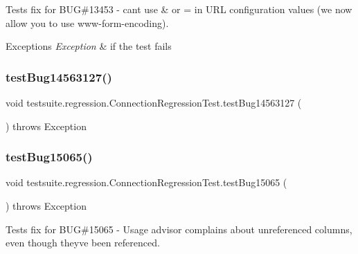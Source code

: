 Tests fix for B\+UG\#13453 -\/ can\textquotesingle{}t use \& or = in U\+RL configuration values (we now allow you to use www-\/form-\/encoding).


\begin{DoxyExceptions}{Exceptions}
{\em Exception} & if the test fails \\
\hline
\end{DoxyExceptions}
\mbox{\label{classtestsuite_1_1regression_1_1_connection_regression_test_ab777c77610ca0c68d9187a864602adba}} 
\subsubsection{\texorpdfstring{test\+Bug14563127()}{testBug14563127()}}
{\footnotesize\ttfamily void testsuite.\+regression.\+Connection\+Regression\+Test.\+test\+Bug14563127 (\begin{DoxyParamCaption}{ }\end{DoxyParamCaption}) throws Exception}

\mbox{\label{classtestsuite_1_1regression_1_1_connection_regression_test_a35b61648054c98948b1f82e6b078c9b7}} 
\subsubsection{\texorpdfstring{test\+Bug15065()}{testBug15065()}}
{\footnotesize\ttfamily void testsuite.\+regression.\+Connection\+Regression\+Test.\+test\+Bug15065 (\begin{DoxyParamCaption}{ }\end{DoxyParamCaption}) throws Exception}

Tests fix for B\+UG\#15065 -\/ Usage advisor complains about unreferenced columns, even though they\textquotesingle{}ve been referenced.


